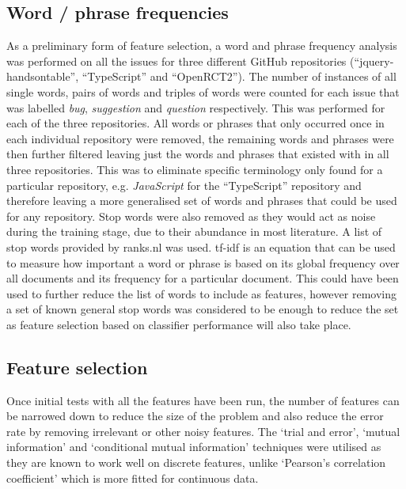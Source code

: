 \subsection{Word / phrase frequencies}
\label{sec:background_wordfreq}
As a preliminary form of feature selection, a word and phrase frequency analysis was performed on all the issues for three
different GitHub repositories (``jquery-handsontable'', ``TypeScript'' and ``OpenRCT2''). The number of instances of all single
words, pairs of words and triples of words were counted for each issue that was labelled \textit{bug}, \textit{suggestion} and
\textit{question} respectively. This was performed for each of the three repositories. All words or phrases that only occurred
once in each individual repository were removed, the remaining words and phrases were then further filtered leaving just the
words and phrases that existed with in all three repositories. This was to eliminate specific terminology only found for a
particular repository, e.g. \textit{JavaScript} for the ``TypeScript'' repository and therefore leaving a more generalised set
of words and phrases that could be used for any repository. Stop words were also removed as they would act as noise during the training stage, due to their abundance in most literature. A list of stop words provided by ranks.nl \cite{ranks.nl} was used.
tf-idf is an equation that can be used to measure how important a word or phrase is based on its global frequency over all
documents and its frequency for a particular document. This could have been used to further reduce the list of words to
include as features, however removing a set of known general stop words was considered to be enough to reduce the set as feature selection based on classifier performance will also take place.

\subsection{Feature selection}
Once initial tests with all the features have been run, the number of features can be narrowed down to reduce the size of the
problem and also reduce the error rate by removing irrelevant or other noisy features. The `trial and error',
`mutual information' and `conditional mutual information' techniques were utilised as they are known to work well on discrete
features, unlike `Pearson's correlation coefficient' which is more fitted for continuous data.

